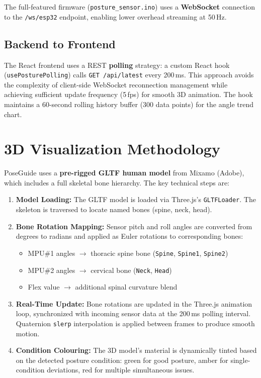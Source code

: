 \documentclass[12pt,a4paper]{report}
\newcommand{\code}[1]{\texttt{\small\color{accentviolet}#1}}
\begin{document}
The full-featured firmware (\code{posture\_sensor.ino}) uses a \textbf{WebSocket} connection to the \code{/ws/esp32} endpoint, enabling lower overhead streaming at 50\,Hz.

\subsection{Backend to Frontend}

The React frontend uses a REST \textbf{polling} strategy: a custom React hook (\code{usePosturePolling}) calls \code{GET /api/latest} every 200\,ms. This approach avoids the complexity of client-side WebSocket reconnection management while achieving sufficient update frequency (5\,fps) for smooth 3D animation. The hook maintains a 60-second rolling history buffer (300 data points) for the angle trend chart.

\section{3D Visualization Methodology}

PoseGuide uses a \textbf{pre-rigged GLTF human model} from Mixamo (Adobe), which includes a full skeletal bone hierarchy. The key technical steps are:

\begin{enumerate}[leftmargin=2em]
    \item \textbf{Model Loading:} The GLTF model is loaded via Three.js's \code{GLTFLoader}. The skeleton is traversed to locate named bones (spine, neck, head).
    \item \textbf{Bone Rotation Mapping:} Sensor pitch and roll angles are converted from degrees to radians and applied as Euler rotations to corresponding bones:
        \begin{itemize}
            \item MPU\#1 angles $\rightarrow$ thoracic spine bone (\code{Spine}, \code{Spine1}, \code{Spine2})
            \item MPU\#2 angles $\rightarrow$ cervical bone (\code{Neck}, \code{Head})
            \item Flex value $\rightarrow$ additional spinal curvature blend
        \end{itemize}
    \item \textbf{Real-Time Update:} Bone rotations are updated in the Three.js animation loop, synchronized with incoming sensor data at the 200\,ms polling interval. Quaternion \code{slerp} interpolation is applied between frames to produce smooth motion.
    \item \textbf{Condition Colouring:} The 3D model's material is dynamically tinted based on the detected posture condition: green for good posture, amber for single-condition deviations, red for multiple simultaneous issues.
\end{enumerate}
\end{document}
